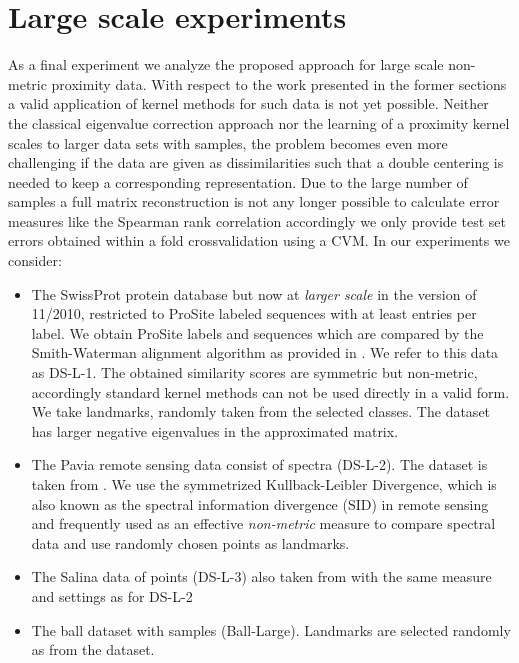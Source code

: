\documentclass[twoside,11pt]{article}
\begin{document}
\section{Large scale experiments}
As a final experiment we analyze the proposed approach for large scale non-metric proximity data. With respect
to the work presented in the former sections a valid application of kernel methods for such data is not yet possible.
Neither the classical eigenvalue correction approach  \cite{DBLP:journals/jmlr/ChenGGRC09} nor the learning
of a proximity kernel \cite{DBLP:conf/icml/ChenGR09} scales to larger data sets with  samples,
the problem becomes even more challenging if the data are given as dissimilarities such that a double
centering is needed to keep a corresponding representation. Due to the large number of samples a full matrix
reconstruction is not any longer possible to calculate error measures like the Spearman rank correlation accordingly
we only provide test set errors obtained within a  fold crossvalidation using a CVM.
In our experiments we consider:
\begin{itemize}
	\item The SwissProt protein database \cite{swissprot} but now at \emph{larger scale} in the version of 11/2010,
restricted to ProSite labeled sequences with at least  entries per label. We obtain 
 ProSite labels and  sequences which are compared by the Smith-Waterman alignment
algorithm as provided in \cite{citeulike:668527}. We refer to this data as DS-L-1. The obtained similarity scores 
are symmetric but non-metric,  accordingly standard kernel methods can not be used directly in a valid form.
We take  landmarks, randomly taken from the selected classes. 
The dataset has  larger negative eigenvalues in the approximated matrix.
\item The Pavia remote sensing data consist of  spectra (DS-L-2). The dataset is taken from \cite{RemoteSensing}. 
	We use the symmetrized Kullback-Leibler Divergence, which is also known as the 
	spectral information divergence (SID) in remote sensing and frequently used as an effective \emph{non-metric} 
	measure to compare spectral data \cite{vanderMeer20063} and use  randomly chosen points as landmarks.

	\item The Salina data of  points (DS-L-3) also taken from \cite{RemoteSensing} with the same measure
	and settings as for DS-L-2
	\item The ball dataset with  samples (Ball-Large). Landmarks are selected randomly as  from the dataset.
\end{itemize}
\end{document}
